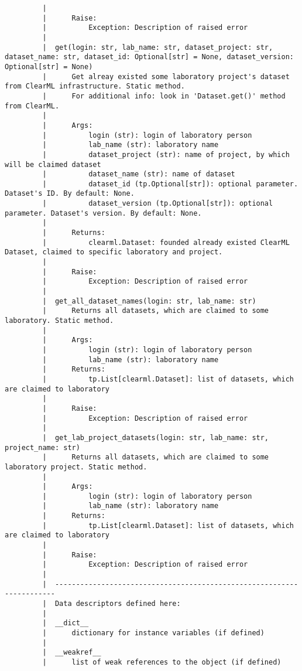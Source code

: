 \begin{lstlisting}
		 |      
		 |      Raise:
		 |          Exception: Description of raised error
		 |  
		 |  get(login: str, lab_name: str, dataset_project: str, dataset_name: str, dataset_id: Optional[str] = None, dataset_version: Optional[str] = None)
		 |      Get alreay existed some laboratory project's dataset from ClearML infrastructure. Static method.
		 |      For additional info: look in 'Dataset.get()' method from ClearML.
		 |      
		 |      Args:
		 |          login (str): login of laboratory person
		 |          lab_name (str): laboratory name
		 |          dataset_project (str): name of project, by which will be claimed dataset
		 |          dataset_name (str): name of dataset
		 |          dataset_id (tp.Optional[str]): optional parameter. Dataset's ID. By default: None.
		 |          dataset_version (tp.Optional[str]): optional parameter. Dataset's version. By default: None.
		 |      
		 |      Returns:
		 |          clearml.Dataset: founded already existed ClearML Dataset, claimed to specific laboratory and project.
		 |      
		 |      Raise:
		 |          Exception: Description of raised error
		 |  
		 |  get_all_dataset_names(login: str, lab_name: str)
		 |      Returns all datasets, which are claimed to some laboratory. Static method.
		 |      
		 |      Args:
		 |          login (str): login of laboratory person
		 |          lab_name (str): laboratory name
		 |      Returns:
		 |          tp.List[clearml.Dataset]: list of datasets, which are claimed to laboratory
		 |      
		 |      Raise:
		 |          Exception: Description of raised error
		 |  
		 |  get_lab_project_datasets(login: str, lab_name: str, project_name: str)
		 |      Returns all datasets, which are claimed to some laboratory project. Static method.
		 |      
		 |      Args:
		 |          login (str): login of laboratory person
		 |          lab_name (str): laboratory name
		 |      Returns:
		 |          tp.List[clearml.Dataset]: list of datasets, which are claimed to laboratory
		 |      
		 |      Raise:
		 |          Exception: Description of raised error
		 |  
		 |  ----------------------------------------------------------------------
		 |  Data descriptors defined here:
		 |  
		 |  __dict__
		 |      dictionary for instance variables (if defined)
		 |  
		 |  __weakref__
		 |      list of weak references to the object (if defined)
		

\end{lstlisting}
